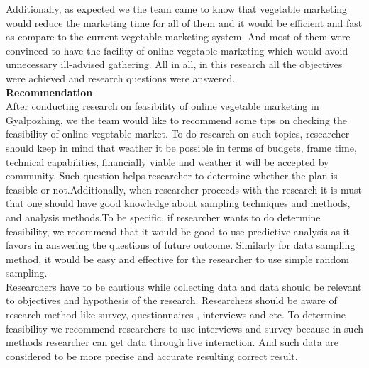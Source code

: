\documentclass[12pt]{report}
\begin{document}
\begin{normalsize}
Additionally, as expected we the team came to know that vegetable marketing would reduce the marketing time for all of them and it would be efficient and fast as compare to the current vegetable marketing system. And most of them were convinced to have the facility of online vegetable marketing which would avoid unnecessary ill-advised gathering. All in all, in this research all the objectives were achieved and research questions were answered.\newline\\[0.1cm]
{\bfseries Recommendation }\newline\\
After conducting research on feasibility of online vegetable marketing in Gyalpozhing, we the team would like to recommend some tips on checking the feasibility of online vegetable market. To do research on such topics, researcher should keep in mind that weather it be possible in terms of budgets, frame time, technical capabilities, financially viable and weather  it will be accepted by community. Such question helps researcher to determine whether the plan is feasible or not.Additionally, when researcher proceeds with the research it is must that  one should have good knowledge about sampling techniques and methods, and analysis methods.To be specific, if researcher wants to do determine feasibility, we recommend that it would be good to use predictive analysis as it favors in answering the questions of future outcome. Similarly for data sampling method, it would be easy and effective for the researcher to use simple random sampling.\newline\\[0.1cm]
Researchers have to be cautious while collecting data and data should be relevant to objectives and hypothesis of the research. Researchers should be aware of research method like survey, questionnaires , interviews and etc. To determine feasibility we recommend researchers to use interviews and survey because in such methods researcher can get data through live interaction. And such data are considered to be more precise and accurate resulting correct result.




\end{normalsize}
\end{document}
